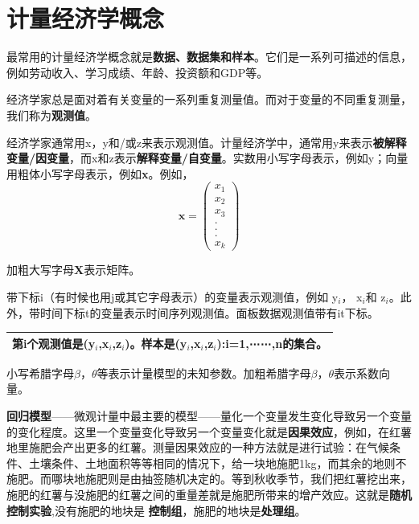 \documentclass[cn,10pt,math=newtx,citestyle=gb7714-2015,bibstyle=gb7714-2015]{elegantbook}
\begin{document}
	\section{计量经济学概念}
	\begin{flushleft}
		最常用的计量经济学概念就是\textbf{数据、数据集和样本}。它们是一系列可描述的信息，例如劳动收入、学习成绩、年龄、投资额和GDP等。
		
		经济学家总是面对着有关变量的一系列重复测量值。而对于变量的不同重复测量，我们称为\textbf{观测值}。
		
		经济学家通常用x，y和/或z来表示观测值。计量经济学中，通常用y来表示\textbf{被解释变量/因变量}，而x和z表示\textbf{解释变量/自变量}。实数用小写字母表示，例如y；向量用粗体小写字母表示，例如\textbf{x}。例如，
		\begin{equation}
			\textbf{x}=
			\left(
			\begin{array}{c}
				x_1\\
				x_2\\
				x_3\\
				.\\
				.\\
				.\\
				x_k
			\end{array}
			\right)
		\end{equation}
		
		加粗大写字母\textbf{X}表示矩阵。
		
		带下标i（有时候也用j或其它字母表示）的变量表示观测值，例如
		y$_i$，
		x$_i$和
		z$_i$。此外，带时间下标t的变量表示时间序列观测值。面板数据观测值带有it下标。
		
		\begin{center}
			\begin{tabular}{|l|}
				\hline
				第i个\textbf{观测值}是(y$_i$,x$_i$,z$_i$)。样本是{(y$_i$,x$_i$,z$_i$):i=1,⋯⋯,n}的集合。\\
				\hline
			\end{tabular}
		\end{center}
		
		小写希腊字母$\beta$，$\theta$等表示计量模型的未知参数。加粗希腊字母\textbf{$\beta$}，\textbf{$\theta$}表示系数向量。
		
		\textbf{回归模型}——微观计量中最主要的模型——量化一个变量发生变化导致另一个变量的变化程度。这里一个变量变化导致另一个变量变化就是\textbf{因果效应}，例如，在红薯地里施肥会产出更多的红薯。测量因果效应的一种方法就是进行试验：在气候条件、土壤条件、土地面积等等相同的情况下，给一块地施肥1kg，而其余的地则不施肥。而哪块地施肥则是由抽签随机决定的。等到秋收季节，我们把红薯挖出来，施肥的红薯与没施肥的红薯之间的重量差就是施肥所带来的增产效应。这就是\textbf{随机控制实验},没有施肥的地块是
		\textbf{控制组}，施肥的地块是\textbf{处理组}。
	\end{flushleft}
\end{document}
